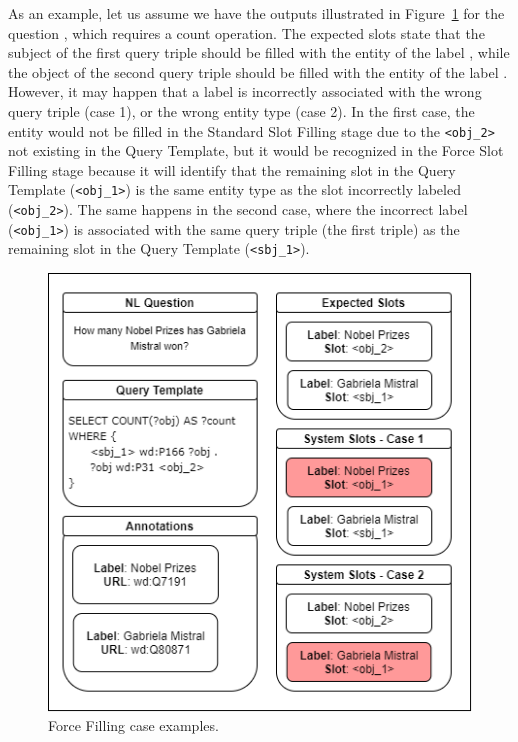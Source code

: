 As an example, let us assume we have the outputs illustrated in Figure~\ref{fig:forceFillingExample} 
for the question , which requires a 
count operation. The expected slots state that the subject of the first query triple should 
be filled with the entity of the label , while the object of the 
second query triple should be filled with the entity of the label . 
However, it may happen that a label is incorrectly associated with the wrong query triple 
(case 1), or the wrong entity type (case 2). In the first case, the  
entity would not be filled in the Standard Slot Filling stage due to the \texttt{<obj\_2>} 
not existing in the Query Template, but it would be recognized in the Force Slot Filling 
stage because it will identify that the remaining slot in the Query Template (\texttt{<obj\_1>}) 
is the same entity type as the slot incorrectly labeled (\texttt{<obj\_2>}). The same happens 
in the second case, where the incorrect label (\texttt{<obj\_1>}) is associated with the same 
query triple (the first triple) as the remaining slot in the Query Template (\texttt{<sbj\_1>}).

\begin{figure}[!h]
    \centering
    \includegraphics[scale=.5]{imagenes/3_system_overview/SlotFillingSpecialCases.png}
    \caption{Force Filling case examples.}
    \label{fig:forceFillingExample}
\end{figure}

